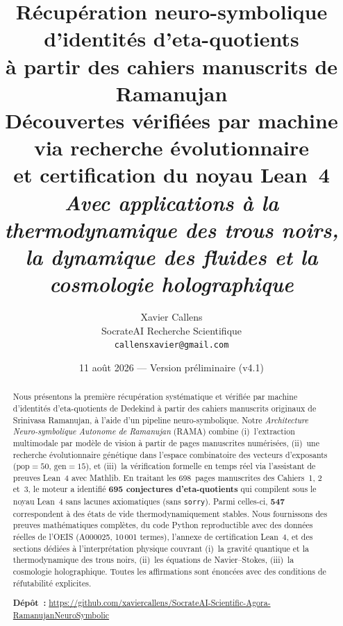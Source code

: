 \documentclass[11pt,a4paper]{article}
\title{\textbf{Récupération neuro-symbolique d'identités d'eta-quotients\\à partir des cahiers manuscrits de Ramanujan}\\[0.5em]\large Découvertes vérifiées par machine via recherche évolutionnaire\\et certification du noyau Lean~4\\[0.3em]\normalsize\textit{Avec applications à la thermodynamique des trous noirs,\\la dynamique des fluides et la cosmologie holographique}}
\author{Xavier Callens\\\small SocrateAI Recherche Scientifique\\\small\texttt{callensxavier@gmail.com}}
\date{11 août 2026 --- Version préliminaire (v4.1)}
\theoremstyle{plain}
\theoremstyle{definition}
\newcommand{\RAMA}{\textsc{RAMA}}
\begin{document}
\maketitle

\begin{abstract}
Nous présentons la première récupération systématique et vérifiée par machine d'identités d'eta-quotients de Dedekind à partir des cahiers manuscrits originaux de Srinivasa Ramanujan, à l'aide d'un pipeline neuro-symbolique. Notre \emph{Architecture Neuro-symbolique Autonome de Ramanujan} (\RAMA{}) combine (i)~l'extraction multimodale par modèle de vision à partir de pages manuscrites numérisées, (ii)~une recherche évolutionnaire génétique dans l'espace combinatoire des vecteurs d'exposants ($\mathrm{pop}=50$, $\mathrm{gen}=15$), et (iii)~la vérification formelle en temps réel via l'assistant de preuves Lean~4 avec Mathlib. En traitant les 698~pages manuscrites des Cahiers~1, 2 et~3, le moteur a identifié \textbf{695 conjectures d'eta-quotients} qui compilent sous le noyau Lean~4 sans lacunes axiomatiques (sans \texttt{sorry}). Parmi celles-ci, \textbf{547} correspondent à des états de vide thermodynamiquement stables. Nous fournissons des preuves mathématiques complètes, du code Python reproductible avec des données réelles de l'OEIS (A000025, 10\,001 termes), l'annexe de certification Lean~4, et des sections dédiées à l'interprétation physique couvrant (i)~la gravité quantique et la thermodynamique des trous noirs, (ii)~les équations de Navier--Stokes, (iii)~la cosmologie holographique. Toutes les affirmations sont énoncées avec des conditions de réfutabilité explicites.

\medskip\noindent\textbf{Dépôt~:} \url{https://github.com/xaviercallens/SocrateAI-Scientific-Agora-RamanujanNeuroSymbolic}
\end{abstract}

\tableofcontents
\newpage
















\appendix


\end{document}

